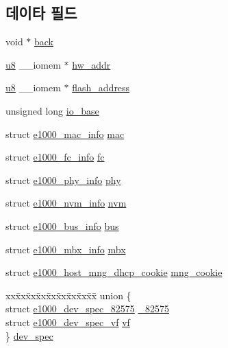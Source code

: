 \subsection*{데이타 필드}
\begin{DoxyCompactItemize}
\item 
void $\ast$ \hyperlink{structe1000__hw_a24db0d03dc4f62a477f24d2a675b7d14}{back}
\item 
\hyperlink{lib_2igb_2e1000__osdep_8h_a8baca7e76da9e0e11ce3a275dd19130c}{u8} \+\_\+\+\_\+iomem $\ast$ \hyperlink{structe1000__hw_a54127b9ee5d8173dc068cf8c43a0600f}{hw\+\_\+addr}
\item 
\hyperlink{lib_2igb_2e1000__osdep_8h_a8baca7e76da9e0e11ce3a275dd19130c}{u8} \+\_\+\+\_\+iomem $\ast$ \hyperlink{structe1000__hw_a43f200a8ab8b32b6c7092611bef689c2}{flash\+\_\+address}
\item 
unsigned long \hyperlink{structe1000__hw_ade48a0e63a0aea4cf71e4185ebe69f7a}{io\+\_\+base}
\item 
struct \hyperlink{structe1000__mac__info}{e1000\+\_\+mac\+\_\+info} \hyperlink{structe1000__hw_aab7fce7aa13ba97459b3b65acf02f520}{mac}
\item 
struct \hyperlink{structe1000__fc__info}{e1000\+\_\+fc\+\_\+info} \hyperlink{structe1000__hw_a7b5f8715a9588ca1c4f6fd5b087aede7}{fc}
\item 
struct \hyperlink{structe1000__phy__info}{e1000\+\_\+phy\+\_\+info} \hyperlink{structe1000__hw_af1b2af2997be0540f732840feb2631c7}{phy}
\item 
struct \hyperlink{structe1000__nvm__info}{e1000\+\_\+nvm\+\_\+info} \hyperlink{structe1000__hw_ac6844c747771b07e1682238abdb95fdd}{nvm}
\item 
struct \hyperlink{structe1000__bus__info}{e1000\+\_\+bus\+\_\+info} \hyperlink{structe1000__hw_a05847de68c651a09a0dda728db08fc4f}{bus}
\item 
struct \hyperlink{structe1000__mbx__info}{e1000\+\_\+mbx\+\_\+info} \hyperlink{structe1000__hw_ad9c9b2a6686763d81d8b45c8abf3e1a4}{mbx}
\item 
struct \hyperlink{structe1000__host__mng__dhcp__cookie}{e1000\+\_\+host\+\_\+mng\+\_\+dhcp\+\_\+cookie} \hyperlink{structe1000__hw_a81aab50e7ccea033c6c4306545157b32}{mng\+\_\+cookie}
\item 
\begin{tabbing}
xx\=xx\=xx\=xx\=xx\=xx\=xx\=xx\=xx\=\kill
union \{\\
\>struct \hyperlink{structe1000__dev__spec__82575}{e1000\_dev\_spec\_82575} \hyperlink{structe1000__hw_a65abf35e3ce1758616d7990fdb4d356e}{\_82575}\\
\>struct \hyperlink{structe1000__dev__spec__vf}{e1000\_dev\_spec\_vf} \hyperlink{structe1000__hw_a8900f357e8e40da8e0422aa25bda6cad}{vf}\\
\} \hyperlink{structe1000__hw_a498aa966bd77b214f1d67900bf6b8236}{dev\_spec}\\


\end{tabbing}
\end{DoxyCompactItemize}
